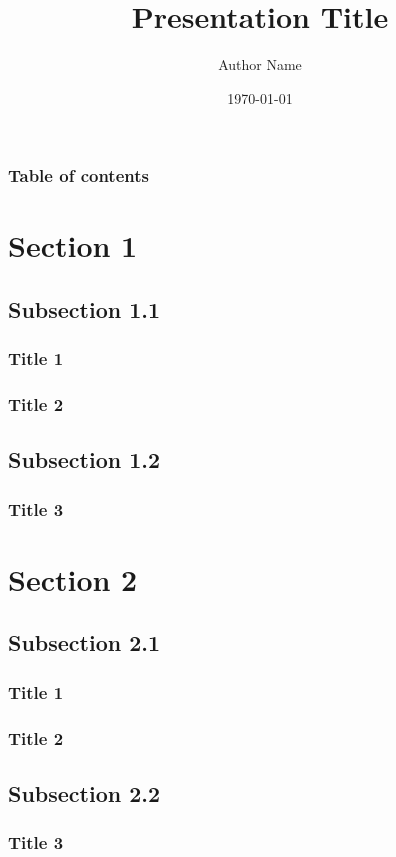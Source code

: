 \documentclass{beamer}
\begin{document}
\title{Presentation Title}  
\author{Author Name}
\date{\today}

\begin{frame}
	\titlepage
\end{frame}

\begin{frame}
  \frametitle{Table of contents}
  \tableofcontents
\end{frame}


\section{Section 1} 
  \subsection{Subsection 1.1}
  \begin{frame}
    \frametitle{Title 1} 
    \lipsum[1-2]
  \end{frame}

  \begin{frame}
    \frametitle{Title 2} 
    \lipsum[2-3]
  \end{frame}

  \subsection{Subsection 1.2}
  \begin{frame}[plain]
    \frametitle{Title 3} 
    \lipsum[3-4]
  \end{frame}

\section{Section 2}
  \subsection{Subsection 2.1}
  \begin{frame}
    \frametitle{Title 1} 
    \lipsum[1-2]
  \end{frame}

  \begin{frame}
    \frametitle{Title 2} 
    \lipsum[2-3]
  \end{frame}

  \subsection{Subsection 2.2}
  \begin{frame}[plain]
    \frametitle{Title 3} 
    \lipsum[3-4]
  \end{frame}
\end{document}
